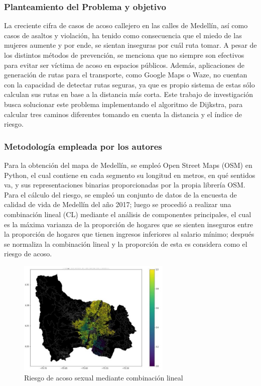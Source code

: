 \subsubsection{Planteamiento del Problema y objetivo }
La creciente cifra de casos de acoso callejero en las calles de Medellín, así como casos de asaltos y violación, ha tenido como consecuencia que el miedo de las mujeres aumente y por ende, se sientan inseguras por cuál ruta tomar. A pesar de los distintos métodos de prevención, se menciona que no siempre son efectivos para evitar ser víctima de acoso en espacios públicos. Además, aplicaciones de generación de rutas para el transporte, como Google Maps o Waze, no cuentan con la capacidad de detectar rutas seguras, ya que es propio sistema de estas sólo calculan sus rutas en base a la distancia más corta. Este trabajo de investigación busca solucionar este problema implementando el algoritmo de Dijkstra, para calcular tres caminos diferentes tomando en cuenta la distancia y el índice de riesgo.

\subsubsection{Metodología empleada por los autores}
Para la obtención del mapa de Medellín, se empleó Open Street Maps (OSM) en Python, el cual contiene en cada segmento su longitud en metros, en qué sentidos va, y sus representaciones binarias proporcionadas por la propia librería OSM. Para el cálculo del riesgo, se empleó un conjunto de datos de la encuesta de calidad de vida de Medellín del año 2017; luego se procedió a realizar una combinación lineal (CL)  mediante el análisis de componentes principales, el cual  es la máxima varianza de la proporción de hogares que se sienten inseguros entre la proporción de hogares que tienen ingresos inferiores al salario mínimo; después se normaliza la combinación lineal y la proporción de esta es considera como el riesgo de acoso.

\begin{figure}[h]
	\begin{center}
		\includegraphics[width=0.65\textwidth]{2/figures/segmento.jpg}
		\caption{Riesgo de acoso sexual mediante combinación lineal}
		\label{1:fig2}
	\end{center}
\end{figure}

